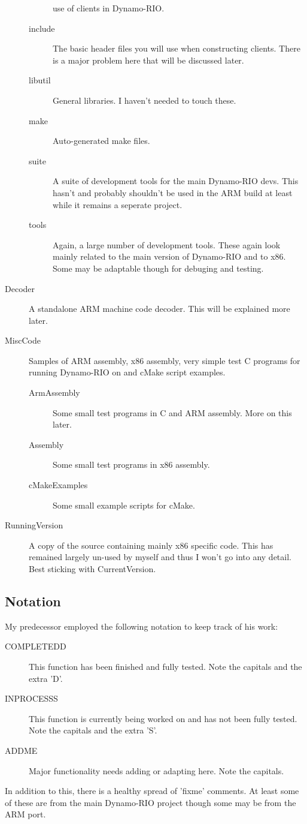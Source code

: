 \documentclass[a4paper]{article}
\begin{document}
\begin{description}
\begin{description}
use of clients in
        Dynamo-RIO.
        \item[include] The basic header files you will use when 
constructing clients.
        There is a major problem here that will be discussed later.
        \item[libutil] General libraries. I haven't needed to touch 
these.
        \item[make] Auto-generated make files.
        \item[suite] A suite of development tools for the main 
Dynamo-RIO devs. This
        hasn't and probably shouldn't be used in the ARM build at least 
while it remains
        a seperate project.
        \item[tools] Again, a large number of development tools. These 
again look mainly
        related to the main version of Dynamo-RIO and to x86. Some may 
be adaptable
        though for debuging and testing.
        \end{description}
\item[Decoder] A standalone ARM machine code decoder. This will be 
explained
more later.
\item[MiscCode] Samples of ARM assembly, x86 assembly, very simple test 
C
programs for running Dynamo-RIO on and cMake script examples.
\begin{description}
        \item[ArmAssembly] Some small test programs in C and ARM 
assembly. More on
        this later.
        \item[Assembly] Some small test programs in x86 assembly.
        \item[cMakeExamples] Some small example scripts for cMake.
\end{description}
\item[RunningVersion] A copy of the source containing mainly x86 
specific code.
This has remained largely un-used by myself and thus I won't go into any 
detail.
Best sticking with CurrentVersion.
\end{description}

\subsection{Notation}
My predecessor employed the following notation to keep track of his work:
\begin{description}
\item[COMPLETEDD] This function has been finished and fully tested. Note the
capitals and the extra 'D'.
\item[INPROCESSS] This function is currently being worked on and has not been
fully tested. Note the capitals and the extra 'S'.
\item[ADDME] Major functionality needs adding or adapting here. Note the
capitals.
\end{description}
In addition to this, there is a healthy spread of 'fixme' comments. At least
some of these are from the main Dynamo-RIO project though some may be from the
ARM port.
\end{document}
